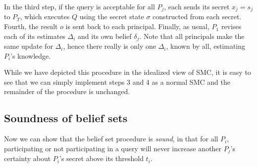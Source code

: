 \documentclass[10pt]{sigplanconf}
\begin{document}

In the third step, if the query is acceptable for all $P_j$, each sends its
secret $x_j = s_j$ to $P_T$, which executes $Q$
using the secret state $\sigma$ constructed from each secret.  Fourth,
the result $o$ is sent back to each principal.  Finally, as usual,
$P_1$ revises each of its estimates $\Delta_i$ and its own belief
$\delta_j$.  Note that all principals make the same update for
$\Delta_i$, hence
there really is only one $ \Delta_i $, known by all, estimating $ P_i
$'s knowledge.

While we have depicted this procedure in the idealized view of SMC, it
is easy to see that we can simply implement steps 3 and 4 as a normal
SMC and the remainder of the procedure is unchanged.

\subsection{Soundness of belief sets}

Now we can show that the belief set procedure is
\emph{sound}, in that for all $P_i$, participating or not
participating in a query will never increase another $P_j$'s certainty
about $P_i$'s secret above its threshold $t_i$.
\end{document}
